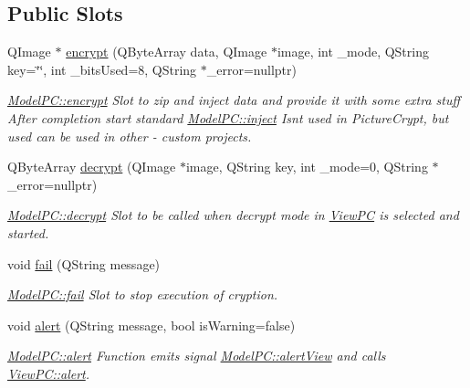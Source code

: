 \subsection*{Public Slots}
\begin{DoxyCompactItemize}
\item 
Q\+Image $\ast$ \hyperlink{class_model_p_c_a6f191f62d4635d0d3555fcc0be298794}{encrypt} (Q\+Byte\+Array data, Q\+Image $\ast$image, int \+\_\+mode, Q\+String key=\char`\"{}\char`\"{}, int \+\_\+bits\+Used=8, Q\+String $\ast$\+\_\+error=nullptr)
\begin{DoxyCompactList}\small\item\em \hyperlink{class_model_p_c_a6f191f62d4635d0d3555fcc0be298794}{Model\+P\+C\+::encrypt} Slot to zip and inject data and provide it with some extra stuff After completion start standard \hyperlink{class_model_p_c_aada6a04d81ada8f2b4ba18108c8d6f10}{Model\+P\+C\+::inject} Isn\textquotesingle{}t used in Picture\+Crypt, but used can be used in other -\/ custom projects. \end{DoxyCompactList}\item 
Q\+Byte\+Array \hyperlink{class_model_p_c_a5995215a34a1e1f504035715a8013809}{decrypt} (Q\+Image $\ast$image, Q\+String key, int \+\_\+mode=0, Q\+String $\ast$\+\_\+error=nullptr)
\begin{DoxyCompactList}\small\item\em \hyperlink{class_model_p_c_a5995215a34a1e1f504035715a8013809}{Model\+P\+C\+::decrypt} Slot to be called when decrypt mode in \hyperlink{class_view_p_c}{View\+PC} is selected and started. \end{DoxyCompactList}\item 
void \hyperlink{class_model_p_c_a47464b59b7e37fcee25e55475708aabd}{fail} (Q\+String message)
\begin{DoxyCompactList}\small\item\em \hyperlink{class_model_p_c_a47464b59b7e37fcee25e55475708aabd}{Model\+P\+C\+::fail} Slot to stop execution of cryption. \end{DoxyCompactList}\item 
void \hyperlink{class_model_p_c_a9079a101d83672aa48fd2dbac797de40}{alert} (Q\+String message, bool is\+Warning=false)
\begin{DoxyCompactList}\small\item\em \hyperlink{class_model_p_c_a9079a101d83672aa48fd2dbac797de40}{Model\+P\+C\+::alert} Function emits signal \hyperlink{class_model_p_c_af0217a7ca5671e26090dc50a5dccdaf5}{Model\+P\+C\+::alert\+View} and calls \hyperlink{class_view_p_c_a7c467169467789561078abc9d4fe57bd}{View\+P\+C\+::alert}. \end{DoxyCompactList}\end{DoxyCompactItemize}
